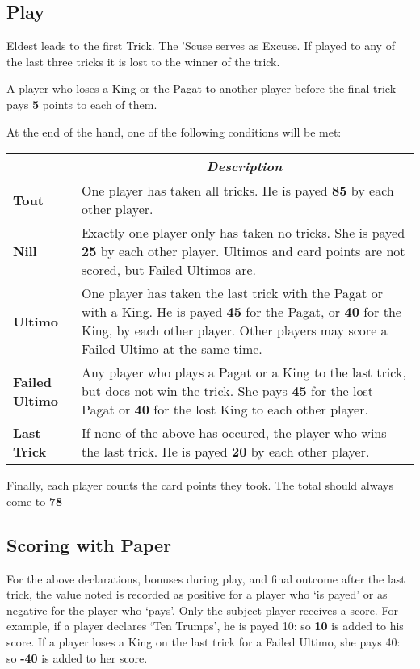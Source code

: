 \documentclass[ebook,12pt,twoside,openright,extrafontsizes,final]{memoir}
\begin{document}
\subsection{Play}
Eldest leads to the first Trick. The ’Scuse serves as Excuse. If played to any of the last
three tricks it is lost to the winner of the trick.

A player who loses a King or the Pagat to another player before the final trick pays 
\textbf{5} points to each of them.

At the end of the hand, one of the following conditions will be met:
\begin{longtable}[c]{lp{3in}}
\multicolumn{1}{c}{} & \multicolumn{1}{c}{\textit{Description}} \\
\endfirsthead
\endhead
\textbf{Tout} & One player has taken all tricks.  He is payed \textbf{85} by each other 
    player. \\
\textbf{Nill} & Exactly one player only has taken no tricks. She is payed \textbf{25} by 
    each other player. Ultimos and card points are not scored, but Failed Ultimos are.\\
\textbf{Ultimo} & One player has taken the last trick with the Pagat or with a King. He is 
    payed \textbf{45} for the Pagat, or \textbf{40} for the King, by each other player. 
    Other players may score a Failed Ultimo at the same time. \\
\textbf{Failed Ultimo} & Any player who plays a Pagat or a King to the last trick, but 
    does not win the trick. She pays \textbf{45} for the lost Pagat or \textbf{40} for 
    the lost King to each other player.\\
\textbf{Last Trick} & If none of the above has occured, the player who wins the last trick.
    He is payed \textbf{20} by each other player. \\
\end{longtable}

Finally, each player counts the card points they took.  The total should always come to 
\textbf{78}

\subsection{Scoring with Paper}
For the above declarations, bonuses during play, and final outcome after the last trick,
the value noted is recorded as positive for a player who ‘is payed’ or as negative for
the player who ‘pays’.  Only the subject player receives a score. For example, if a player
declares ‘Ten Trumps’, he is payed 10: so \textbf{10} is added to his score.  If a player
loses a King on the last trick for a Failed Ultimo, she pays 40: so \textbf{-40} is added
to her score.
\end{document}
